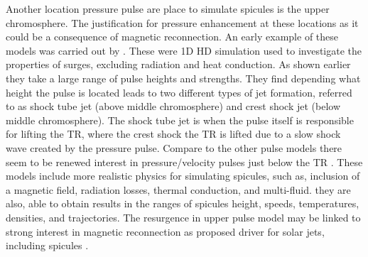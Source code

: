 \documentclass[12pt]{ociamthesis}
\begin{document}
Another location pressure pulse are place to simulate spicules is the upper chromosphere. The justification for pressure enhancement at these locations as it could be a consequence of magnetic reconnection. An early example of these models was carried out by \cite{Shibata1982}. These were 1D HD simulation used to investigate the properties of surges, excluding radiation and heat conduction. As shown earlier they take a large range of pulse heights and strengths. They find depending what height the pulse is located leads to two different types of jet formation, referred to as shock tube jet (above middle chromosphere) and crest shock jet (below middle chromosphere). The shock tube jet is when the pulse itself is responsible for lifting the TR, where the crest shock the TR is lifted due to a slow shock wave created by the pressure pulse. Compare to the other pulse models there seem to be renewed interest in pressure/velocity pulses just below the TR \citep{Murawski2010AA519A8M, Smirnova2016SoPh2913207S, Kuzma2017AA597A133K, kuzma2017ApJ84978K, Singh2019}. These models include more realistic physics for simulating spicules, such as, inclusion of a magnetic field, radiation losses, thermal conduction, and multi-fluid. they are also, able to obtain results in the ranges of spicules height, speeds, temperatures, densities, and trajectories. The resurgence in upper pulse model may be linked to strong interest in magnetic reconnection as proposed driver for solar jets, including spicules \citep{Yokoyama1995Natur37542Y, Yokoyama1996PASJ48353Y, Pontieu2007PASJ, Gonz2017ApJ, Gonz2018ApJ856176G}.
\end{document}
